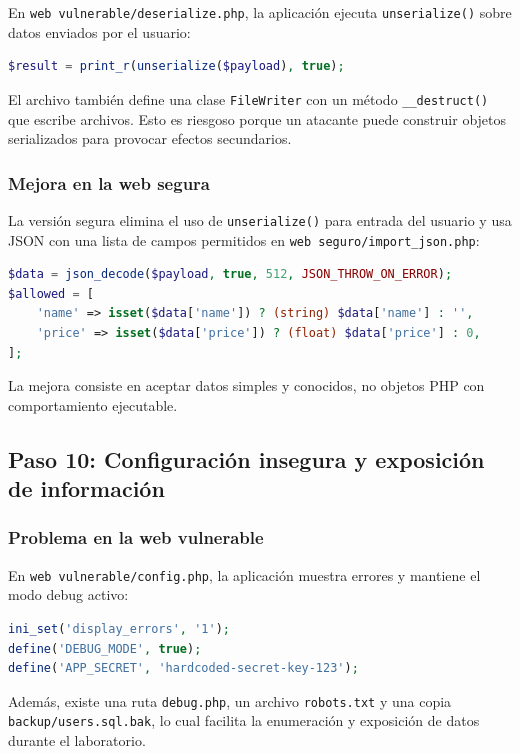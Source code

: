 \documentclass[12pt,a4paper]{article}
\begin{document}
En \texttt{web vulnerable/deserialize.php}, la aplicación ejecuta \texttt{unserialize()} sobre datos enviados por el usuario:

\begin{lstlisting}[language=PHP]
$result = print_r(unserialize($payload), true);
\end{lstlisting}

El archivo también define una clase \texttt{FileWriter} con un método \texttt{\_\_destruct()} que escribe archivos. Esto es riesgoso porque un atacante puede construir objetos serializados para provocar efectos secundarios.

\subsubsection*{Mejora en la web segura}

La versión segura elimina el uso de \texttt{unserialize()} para entrada del usuario y usa JSON con una lista de campos permitidos en \texttt{web seguro/import\_json.php}:

\begin{lstlisting}[language=PHP]
$data = json_decode($payload, true, 512, JSON_THROW_ON_ERROR);
$allowed = [
    'name' => isset($data['name']) ? (string) $data['name'] : '',
    'price' => isset($data['price']) ? (float) $data['price'] : 0,
];
\end{lstlisting}

La mejora consiste en aceptar datos simples y conocidos, no objetos PHP con comportamiento ejecutable.

\subsection{Paso 10: Configuración insegura y exposición de información}

\subsubsection*{Problema en la web vulnerable}

En \texttt{web vulnerable/config.php}, la aplicación muestra errores y mantiene el modo debug activo:

\begin{lstlisting}[language=PHP]
ini_set('display_errors', '1');
define('DEBUG_MODE', true);
define('APP_SECRET', 'hardcoded-secret-key-123');
\end{lstlisting}

Además, existe una ruta \texttt{debug.php}, un archivo \texttt{robots.txt} y una copia \texttt{backup/users.sql.bak}, lo cual facilita la enumeración y exposición de datos durante el laboratorio.
\end{document}
